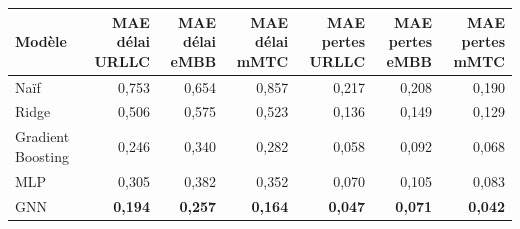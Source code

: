 \begin{tabular}{lrrrrrr}
\toprule
Modèle & MAE délai URLLC & MAE délai eMBB & MAE délai mMTC & MAE pertes URLLC & MAE pertes eMBB & MAE pertes mMTC \\
\midrule
Naïf & 0{,}753 & 0{,}654 & 0{,}857 & 0{,}217 & 0{,}208 & 0{,}190 \\
Ridge & 0{,}506 & 0{,}575 & 0{,}523 & 0{,}136 & 0{,}149 & 0{,}129 \\
Gradient Boosting & 0{,}246 & 0{,}340 & 0{,}282 & 0{,}058 & 0{,}092 & 0{,}068 \\
MLP & 0{,}305 & 0{,}382 & 0{,}352 & 0{,}070 & 0{,}105 & 0{,}083 \\
GNN & \textbf{0{,}194} & \textbf{0{,}257} & \textbf{0{,}164} & \textbf{0{,}047} & \textbf{0{,}071} & \textbf{0{,}042} \\
\bottomrule
\end{tabular}